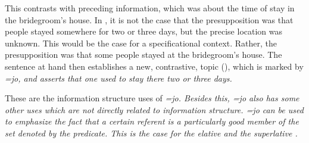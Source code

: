 This contrasts with preceding information, which was about the time of stay in the bridegroom's house. In , it is not the case that the presupposition was that people stayed somewhere for two or three days, but the precise location was unknown. This would be the case for a specificational context. Rather, the presupposition was that some people stayed at the bridegroom's house. The sentence at hand then establishes a new, contrastive,  topic (), which is marked by \em =jo\em, and asserts that one used to stay there two or three days.


% 
% 

These are the information structure uses of \em =jo\em. Besides this, \em =jo \em also has  some other uses which are not directly related to information structure. \em =jo \em can be used to emphasize the fact that a certain referent is a particularly good member of the set denoted by the predicate. This is the case for the elative  and the superlative .



